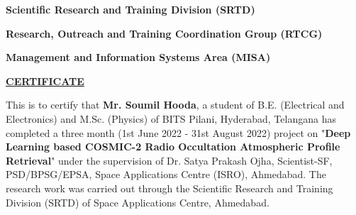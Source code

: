 \documentclass[a4paper,12pt,twoside]{article}
\begin{document}
\newpage
\begin{center}
\begin{large}
	\textbf{Scientific Research and Training Division (SRTD)} \\
\end{large}
\begin{large}
	\textbf{Research, Outreach and Training Coordination Group (RTCG)} \\
\end{large}
\begin{large}
	\textbf{Management and Information Systems Area (MISA)} \\
\end{large}
\end{center}
\vspace{0.5cm}
\begin{center}
\begin{Large}
\underline{\textbf{CERTIFICATE}} \\
\end{Large}
\end{center}
\vspace{1.5cm}
\begin{center}
	\justifying
This is to certify that \textbf{Mr. Soumil Hooda}, a student of B.E. (Electrical and Electronics) and M.Sc. (Physics) of BITS Pilani, Hyderabad, Telangana has completed a three month (1st June 2022 - 31st August 2022) project on "\textbf{Deep Learning based COSMIC-2 Radio Occultation Atmospheric Profile Retrieval}" under the supervision of Dr. Satya Prakash Ojha, Scientist-SF, PSD/BPSG/EPSA, Space Applications Centre (ISRO), Ahmedabad. The research work was carried out through the Scientific Research and Training Division (SRTD) of Space Applications Centre, Ahmedabad. 
\end{center}
\end{document}
